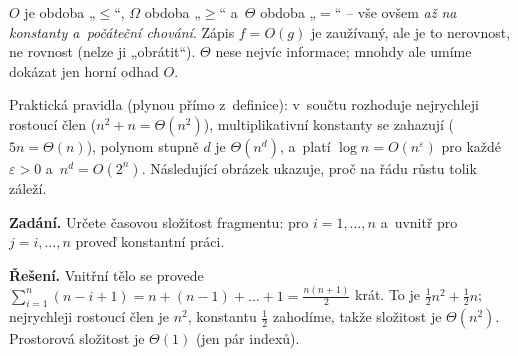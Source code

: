 \documentclass[11pt,a4paper]{article}
\begin{document}
\begin{intuice}
$O$ je obdoba „$\le$``, $\Omega$ obdoba „$\ge$`` a~$\Theta$ obdoba „$=$`` -- vše ovšem \emph{až na konstanty a~počáteční chování}. Zápis $f=O(g)$ je zaužívaný, ale je to nerovnost, ne rovnost (nelze ji „obrátit``). $\Theta$ nese nejvíc informace; mnohdy ale umíme dokázat jen horní odhad $O$.
\end{intuice}

Praktická pravidla (plynou přímo z~definice): v~součtu rozhoduje nejrychleji rostoucí člen ($n^2+n=\Theta(n^2)$), multiplikativní konstanty se zahazují ($5n=\Theta(n)$), polynom stupně $d$ je $\Theta(n^d)$, a~platí $\log n = O(n^\varepsilon)$ pro každé $\varepsilon>0$ a~$n^d=O(2^n)$. Následující obrázek ukazuje, proč na řádu růstu tolik záleží.

\begin{center}
\end{center}

\begin{priklad}
\textbf{Zadání.} Určete časovou složitost fragmentu: pro $i=1,\dots,n$ a~uvnitř pro $j=i,\dots,n$ proveď konstantní práci.\par
\textbf{Řešení.} Vnitřní tělo se provede $\sum_{i=1}^{n}(n-i+1)=n+(n-1)+\dots+1=\tfrac{n(n+1)}2$ krát. To je $\tfrac12 n^2+\tfrac12 n$; nejrychleji rostoucí člen je $n^2$, konstantu $\tfrac12$ zahodíme, takže složitost je $\boxed{\Theta(n^2)}$. Prostorová složitost je $\Theta(1)$ (jen pár indexů).
\end{priklad}
\end{document}
